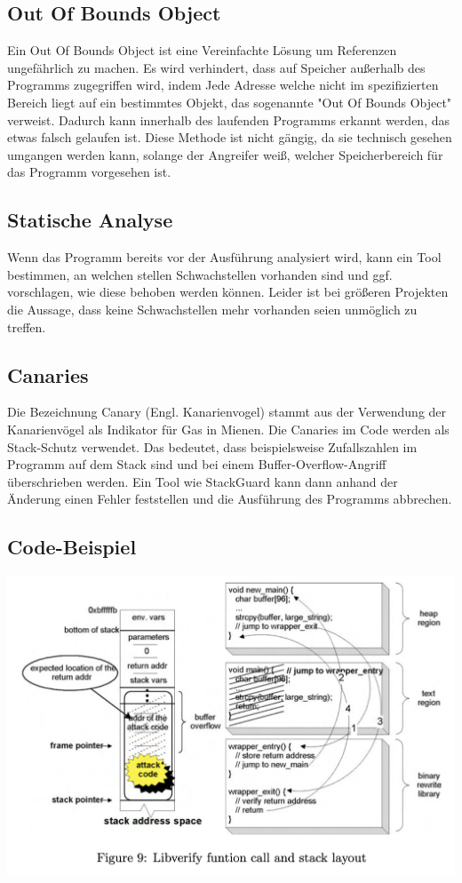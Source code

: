 \subsection{Out Of Bounds Object}
Ein Out Of Bounds Object ist eine Vereinfachte Lösung um Referenzen ungefährlich zu machen.
Es wird verhindert, dass auf Speicher außerhalb des Programms zugegriffen wird, indem Jede
Adresse welche nicht im spezifizierten Bereich liegt auf ein bestimmtes Objekt, das sogenannte
"Out Of Bounds Object" verweist. Dadurch kann innerhalb des laufenden Programms erkannt werden, das
etwas falsch gelaufen ist. Diese Methode ist nicht gängig, da sie technisch gesehen
umgangen werden kann, solange der Angreifer weiß, welcher Speicherbereich für das Programm
vorgesehen ist.

\subsection{Statische Analyse}
Wenn das Programm bereits vor der Ausführung analysiert wird, kann ein
Tool bestimmen, an welchen stellen Schwachstellen vorhanden sind und
ggf. vorschlagen, wie diese behoben werden können. Leider ist bei größeren
Projekten die Aussage, dass keine Schwachstellen mehr vorhanden seien
unmöglich zu treffen.

\subsection{Canaries}
Die Bezeichnung Canary (Engl. Kanarienvogel) stammt aus der Verwendung der Kanarienvögel als
Indikator für Gas in Mienen. Die Canaries im Code werden als Stack-Schutz verwendet. Das bedeutet,
dass beispielsweise Zufallszahlen im Programm auf dem Stack sind und bei einem Buffer-Overflow-Angriff
überschrieben werden. Ein Tool wie StackGuard kann dann anhand der Änderung einen Fehler feststellen und
die Ausführung des Programms abbrechen.


\subsection{Code-Beispiel}
    \begin{center}
        \includegraphics[width=\textwidth,height=0.75\textheight,keepaspectratio]{images/Libverify.png}
    \end{center}

